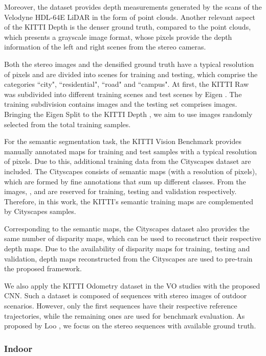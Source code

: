 \documentclass[5p]{elsarticle}
\begin{document}
Moreover, the dataset provides depth measurements generated by the scans of the Velodyne HDL-64E LiDAR in the form of point clouds. Another relevant aspect of the KITTI Depth is the denser ground truth, compared to the point clouds, which presents a grayscale image format, whose pixels provide the depth information of the left and right scenes from the stereo cameras.

Both the stereo images and the densified ground truth have a typical resolution of  pixels and are divided into  scenes for training and testing, which comprise the categories ``city", ``residential", ``road" and ``campus". At first, the KITTI Raw \cite{geiger2013vision} was subdivided into  different training scenes and  test scenes by Eigen \etal\cite{eigen2014depth}. The training subdivision contains  images and the testing set comprises  images. Bringing the Eigen Split to the KITTI Depth \cite{uhrig2017sparsity}, we aim to use  images randomly selected from the total  training samples.

For the semantic segmentation task, the KITTI Vision Benchmark provides  manually annotated maps for training and  test samples with a typical resolution of  pixels. Due to this, additional training data from the Cityscapes dataset  \cite{cordts2016cityscapes} are included. The Cityscapes consists of  semantic maps (with a resolution of  pixels), which are formed by fine annotations that sum up  different classes. From the  images, ,  and  are reserved for training, testing and validation respectively. Therefore, in this work, the KITTI's  semantic training maps are complemented by  Cityscapes samples.  

Corresponding to the semantic maps, the Cityscapes dataset also provides the same number of disparity maps, which can be used to reconstruct their respective depth maps. Due to the availability of disparity maps for training, testing and validation,  depth maps reconstructed from the Cityscapes are used to pre-train the proposed framework.

We also apply the KITTI Odometry dataset \cite{Geiger2012CVPR} in the VO studies with the proposed CNN. Such a dataset is composed of  sequences with stereo images of outdoor scenarios. However, only the first  sequences have their respective reference trajectories, while the remaining ones are used for benchmark evaluation. As proposed by Loo \etal\cite{loo2019cnn}, we focus on the stereo sequences with available ground truth.  

\subsubsection{Indoor}
\label{nyu}
\end{document}
